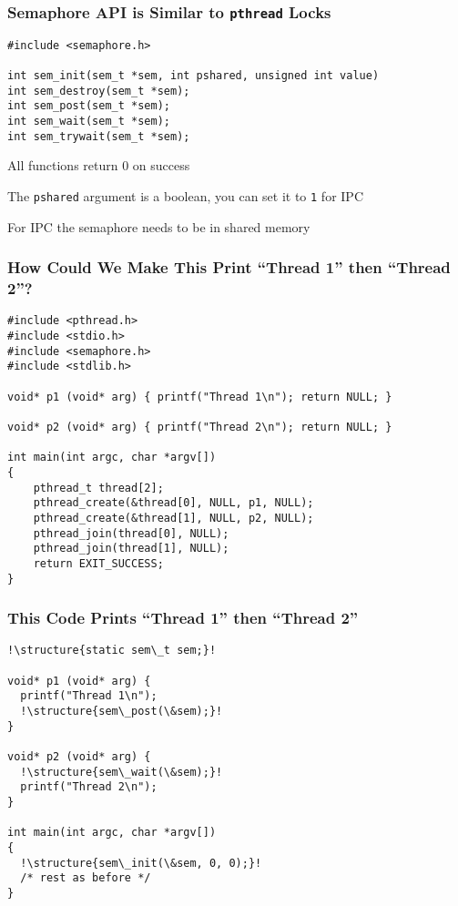   \begin{frame}[fragile]
    \frametitle{Semaphore API is Similar to \texttt{pthread} Locks}
  
    \begin{lstlisting}
#include <semaphore.h>

int sem_init(sem_t *sem, int pshared, unsigned int value)
int sem_destroy(sem_t *sem);
int sem_post(sem_t *sem);
int sem_wait(sem_t *sem);
int sem_trywait(sem_t *sem);
    \end{lstlisting}

    \vspace{2em}

    All functions return 0 on success

    \vspace{2em}

    The \texttt{pshared} argument is a boolean, you can set it to \texttt{1} for
    IPC

    \hspace{2em} For IPC the semaphore needs to be in shared memory
  \end{frame}

  \begin{frame}[fragile]
    \frametitle{How Could We Make This Print ``Thread 1'' then ``Thread 2''?}

    \begin{lstlisting}
#include <pthread.h>
#include <stdio.h>
#include <semaphore.h>
#include <stdlib.h>

void* p1 (void* arg) { printf("Thread 1\n"); return NULL; }

void* p2 (void* arg) { printf("Thread 2\n"); return NULL; }

int main(int argc, char *argv[])
{
    pthread_t thread[2];
    pthread_create(&thread[0], NULL, p1, NULL);
    pthread_create(&thread[1], NULL, p2, NULL);
    pthread_join(thread[0], NULL);
    pthread_join(thread[1], NULL);
    return EXIT_SUCCESS;
}
    \end{lstlisting}
  \end{frame}

  \begin{frame}[fragile]
    \frametitle{This Code Prints ``Thread 1'' then ``Thread 2''}

    \begin{lstlisting}[escapechar=!]
!\structure{static sem\_t sem;}!

void* p1 (void* arg) {
  printf("Thread 1\n");
  !\structure{sem\_post(\&sem);}!
}

void* p2 (void* arg) {
  !\structure{sem\_wait(\&sem);}!
  printf("Thread 2\n");
}

int main(int argc, char *argv[])
{
  !\structure{sem\_init(\&sem, 0, 0);}!
  /* rest as before */
}
    \end{lstlisting}
  \end{frame}

